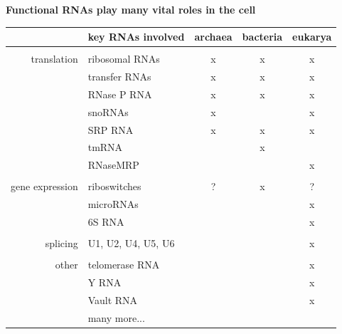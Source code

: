 \documentclass[landscape]{slides}
\begin{document}
\begin{slide}
\begin{center}
\textbf{Functional RNAs play many vital roles in the cell}
\end{center}
\medskip

\small
\begin{center}
\begin{tabular}{r|l|ccc}
 & key RNAs involved & archaea & bacteria & eukarya \\ \hline
 & \\ 
translation & ribosomal RNAs & x & x & x \\
            & transfer RNAs  & x & x & x \\
            & RNase P RNA    & x & x & x \\
            & snoRNAs        & x &   & x \\ 
            & SRP RNA        & x & x & x \\ 
            & tmRNA          &   & x &   \\ 
            & RNaseMRP       &   &   & x \\ 
            &  \\ 
gene expression & riboswitches & ? & x & ? \\
                & microRNAs &  & & x \\
                & 6S RNA & & & x\\ 
                & \\ 
splicing        & U1, U2, U4, U5, U6 & & & x \\ 
                & \\
other           & telomerase RNA & & & x \\ 
                & Y RNA          & & & x \\
                & Vault RNA      & & & x \\
                & many more... & & & \\ 
\end{tabular}
\end{center}

\vfill
\end{slide}
\end{document}
